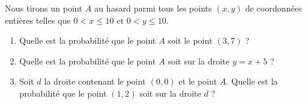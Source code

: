 
\begin{exercice}\label{exosmath-0279}

    Nous tirons un point \( A\) au hasard parmi tous les points \( (x,y)\) de coordonnées entières telles que \( 0< x\leq 10\) et \( 0< y\leq 10\).
    \begin{enumerate}
        \item
            Quelle est la probabilité que le point \( A\) soit le point \( (3,7)\) ?
        \item
            Quelle est la probabilité que le point \( A\) soit sur la droite \( y=x+5\) ?
        \item
            Soit \( d\) la droite contenant le point \( (0,0)\) et le point \( A\). Quelle est la probabilité que le point \( (1,2)\) soit sur la droite \( d\) ?
    \end{enumerate}

\end{exercice}
